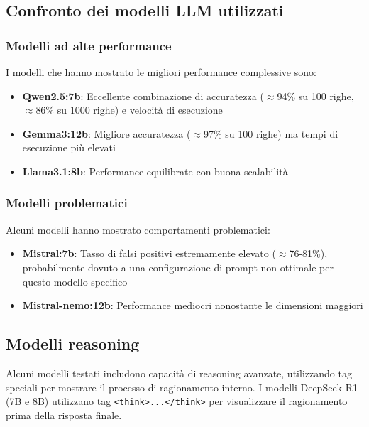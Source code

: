 \documentclass[12pt]{report}
\begin{document}
\subsection{Confronto dei modelli LLM utilizzati}
\label{sec:confronto_modelli}

\subsubsection{Modelli ad alte performance}
I modelli che hanno mostrato le migliori performance complessive sono:

\begin{itemize}
    \item \textbf{Qwen2.5:7b}: Eccellente combinazione di accuratezza ($\approx$94\% su 100 righe, $\approx$86\% su 1000 righe) e velocità di esecuzione
    \item \textbf{Gemma3:12b}: Migliore accuratezza ($\approx$97\% su 100 righe) ma tempi di esecuzione più elevati
    \item \textbf{Llama3.1:8b}: Performance equilibrate con buona scalabilità
\end{itemize}

\subsubsection{Modelli problematici}
Alcuni modelli hanno mostrato comportamenti problematici:

\begin{itemize}
    \item \textbf{Mistral:7b}: Tasso di falsi positivi estremamente elevato ($\approx$76-81\%), probabilmente dovuto a una configurazione di prompt non ottimale per questo modello specifico
    \item \textbf{Mistral-nemo:12b}: Performance mediocri nonostante le dimensioni maggiori
\end{itemize}

\subsection{Modelli reasoning}
\label{subsec:modelli_reasoning}

Alcuni modelli testati includono capacità di reasoning avanzate, utilizzando tag speciali per mostrare il processo di ragionamento interno. I modelli DeepSeek R1 (7B e 8B) utilizzano tag \texttt{<think>...</think>} per visualizzare il ragionamento prima della risposta finale.
\end{document}
